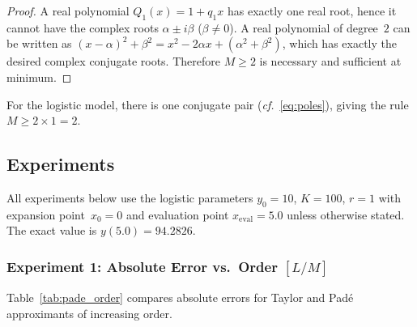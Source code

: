 \documentclass[12pt,a4paper]{article}
\theoremstyle{definition}
\theoremstyle{remark}
\begin{document}
\begin{proof}
  A real polynomial $Q_1(x) = 1 + q_1 x$ has exactly one real root,
  hence it cannot have the complex roots $\alpha \pm i\beta$
  ($\beta \neq 0$).  A real polynomial of degree~$2$ can be written
  as $(x - \alpha)^2 + \beta^2 = x^2 - 2\alpha x + (\alpha^2 +
  \beta^2)$, which has exactly the desired complex conjugate roots.
  Therefore $M \geq 2$ is necessary and sufficient at minimum.
\end{proof}

For the logistic model, there is one conjugate pair
(\emph{cf.}~\eqref{eq:poles}), giving the rule
$M \geq 2 \times 1 = 2$.

\subsection{Experiments}

All experiments below use the logistic parameters
$y_0 = 10$, $K = 100$, $r = 1$ with expansion point~$x_0 = 0$
and evaluation point $x_{\mathrm{eval}} = 5.0$ unless otherwise stated.
The exact value is $y(5.0) = 94.2826$.

\subsubsection{Experiment 1: Absolute Error vs.\ Order \texorpdfstring{$[L/M]$}{[L/M]}}

Table~\ref{tab:pade_order} compares absolute errors for Taylor and
Padé approximants of increasing order.
\end{document}

